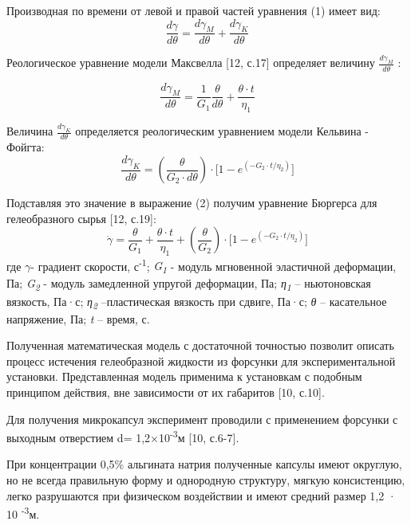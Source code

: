 \begin{multicols}{2}


Производная по времени от левой и правой частей уравнения (1) имеет вид:
\begin{equation}
      \frac{d\gamma}{d\theta}= \frac{d\gamma_{M}}{d\theta} + \frac{d\gamma_{K}}{d\theta} \tag{2}
\end{equation}
     


Реологическое уравнение модели Максвелла {[}12, с.17{]} определяет
величину	$\frac{d\gamma_{M}}{d\theta} $ :

\begin{equation}
	\frac{d\gamma_{M}}{d\theta} = \frac{1}{G_1} \frac{\theta}{d\theta} + \frac{\theta \cdot t}{\eta_{1}}  \tag{3}
\end{equation}


Величина $\frac{d\gamma_{K}}{d\theta}$ определяется реологическим уравнением модели Кельвина - Фойгта:
\begin{equation}
	\frac{d\gamma_{K}}{d\theta} = \left( \frac{\theta}{G_{2} \cdot d\theta} \right) \cdot \lbrack 1 - e^{( - G_{2} \cdot t/\eta_{2})}\rbrack \tag{4}
\end{equation}

Подставляя это значение в выражение (2) получим уравнение Бюргерса для
гелеобразного сырья {[}12, с.19{]}:
\begin{equation}
	\dot{\gamma} = \frac{\theta}{G_{1}} + \frac{\theta \cdot t}{\eta_{1}} + (\frac{\theta}{G_{2}}) \cdot \lbrack 1 - e^{( - G_{2} \cdot t/\eta_{2})}\rbrack \tag{5}
\end{equation}
где $\gamma $- градиент скорости, с\textsuperscript{-1}; \emph{G\textsubscript{1}} - модуль мгновенной
эластичной деформации, Па; \emph{G\textsubscript{2}} - модуль
замедленной упругой деформации, Па; \emph{η\textsubscript{1}} --
ньютоновская вязкость, Па·с; \emph{η\textsubscript{2}} --пластическая
вязкость при сдвиге, Па·с; \emph{θ} -- касательное напряжение, Па;
\emph{t} -- время, с.

Полученная математическая модель с достаточной точностью позволит
описать процесс истечения гелеобразной жидкости из форсунки для
экспериментальной установки. Представленная модель применима к
установкам с подобным принципом действия, вне зависимости от их
габаритов {[}10, с.10{]}.

Для получения микрокапсул эксперимент проводили с применением форсунки с
выходным отверстием d= 1,2×10\textsuperscript{-3}м {[}10, с.6-7{]}.

При концентрации 0,5\% альгината натрия полученные капсулы имеют
округлую, но не всегда правильную форму и однородную структуру, мягкую
консистенцию, легко разрушаются при физическом воздействии и имеют
средний размер 1,2 · 10 \textsuperscript{-3}м.
\end{multicols}


